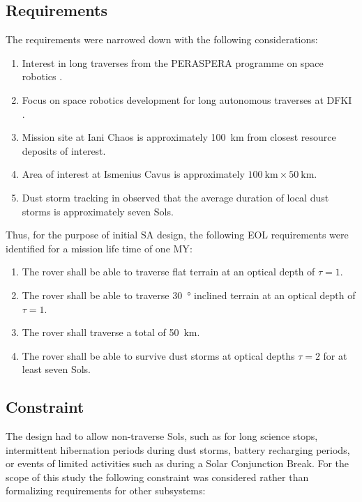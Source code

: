 
\subsection{Requirements}
\label{sec:sec:Design:RequirementsAndDesignDrivers:Requirements}
The requirements were narrowed down with the following considerations:

\begin{enumerate}[label=\textbf{\textcolor{BulletBlue}{(\alph*)}}]
    \item Interest in long traverses from the PERASPERA programme on space robotics .
    \item Focus on space robotics development for long autonomous traverses at \ac{DFKI}  .
    \item Mission site at Iani Chaos is approximately \SI{100}{\kilo\meter} from closest resource deposits of interest.
    \item Area of interest at Ismenius Cavus is approximately $\SI{100}{\kilo\meter} \times \SI{50}{\kilo\meter}$.
    \item Dust storm tracking in  observed that the average duration of local dust storms is approximately seven Sols.
\end{enumerate}

Thus, for the purpose of initial \ac{SA} design, the following \ac{EOL} requirements were identified for a mission life time of one \ac{MY}:

\begin{enumerate}[label=\textbf{\textcolor{BulletBlue}{R-\arabic*}}]
    \item The rover shall be able to traverse flat terrain at an optical depth of $\tau = 1$.
    \item The rover shall be able to traverse \SI{30}{\degree} inclined terrain at an optical depth of $\tau = 1$.
    \item The rover shall traverse a total of \SI{50}{\kilo\meter}.
    \item The rover shall be able to survive dust storms at optical depths $\tau = 2$ for at least seven Sols.
\end{enumerate}

\subsection{Constraint}
\label{sec:Design:RequirementsAndDesignDrivers:Constraints}
The design had to allow non-traverse Sols, such as for long science stops, intermittent hibernation periods during dust storms, battery recharging periods, or events of limited activities such as during a Solar Conjunction Break. For the scope of this study the following constraint was considered rather than formalizing requirements for other subsystems:

